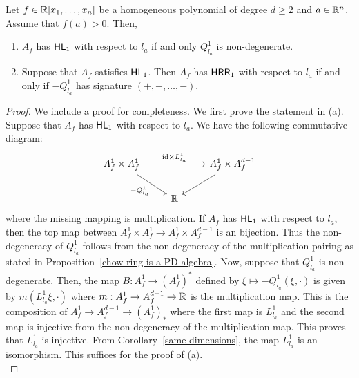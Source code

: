 \documentclass{puthesis-UG}
\begin{document}
\begin{prop}  \label{conditions-for-HL-HRR}
	Let $f \in \mathbb{R}[x_1, \ldots, x_n]$ be a homogeneous polynomial of degree $d \geq 2$ and $a \in \mathbb{R}^n$. Assume that $f(a) > 0$. Then, 
	\begin{enumerate}[label = (\alph*)]
		\item $A_f$ has $\mathsf{HL}_1$ with respect to $l_a$ if and only $Q_{l_a}^1$ is non-degenerate. 

		\item Suppose that $A_f$ satisfies $\mathsf{HL}_1$. Then $A_f$ has $\mathsf{HRR}_1$ with respect to $l_a$ if and only if $-Q_{l_a}^1$ has signature $(+, -, \ldots, -)$. 
	\end{enumerate}
\end{prop}

\begin{proof}
	We include a proof for completeness. We first prove the statement in (a). Suppose that $A_f$ has $\mathsf{HL}_1$ with respect to $l_a$. We have the following commutative diagram:
	\[\begin{tikzcd}
	{A_f^1 \times A_f^1} && {A_f^1 \times A_f^{d-1}} \\
	& {\mathbb{R}}
	\arrow["{\text{id} \times L_{l_a}^1}", from=1-1, to=1-3]
	\arrow["{-Q_{l_a}^1}"', from=1-1, to=2-2]
	\arrow[from=1-3, to=2-2]
\end{tikzcd}\]
where the missing mapping is multiplication. If $A_f$ has $\mathsf{HL}_1$ with respect to $l_a$, then the top map between $A_f^1 \times A_f^1 \to A_f^1 \times A_f^{d-1}$ is an bijection. Thus the non-degeneracy of $Q_{l_a}^1$ follows from the non-degeneracy of the multiplication pairing as stated in Proposition~\ref{chow-ring-is-a-PD-algebra}. Now, suppose that $Q_{l_a}^1$ is non-degenerate. Then, the map $B : A_f^1 \to (A_f^1)^*$ defined by $\xi \mapsto -Q_{l_a}^1(\xi, \cdot)$ is given by $m(L_{l_a}^1 \xi, \cdot)$ where $m : A_f^1 \to A_f^{d-1} \to \mathbb{R}$ is the multiplication map. This is the composition of $A_f^1 \to A_f^{d-1} \to (A_f^1)_*$ where the first map is $L_{l_a}^1$ and the second map is injective from the non-degeneracy of the multiplication map. This proves that $L_{l_a}^1$ is injective. From Corollary~\ref{same-dimensions}, the map $L_{l_a}^1$ is an isomorphism. This suffices for the proof of (a). \\


\end{proof}
\end{document}
